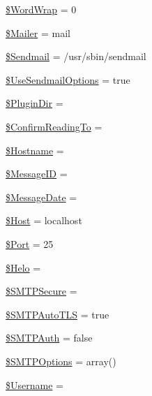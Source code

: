 \begin{DoxyCompactItemize}
\item 
\hyperlink{class_p_h_p_mailer_a8e8553ff133401f5324229a988995a34}{\$\+Word\+Wrap} = 0
\item 
\hyperlink{class_p_h_p_mailer_a7792543896c9a827d4bfd3e29d2e0b01}{\$\+Mailer} = \textquotesingle{}mail\textquotesingle{}
\item 
\hyperlink{class_p_h_p_mailer_aea0de75e10af3f581a0a412f41b9db66}{\$\+Sendmail} = \textquotesingle{}/usr/sbin/sendmail\textquotesingle{}
\item 
\hyperlink{class_p_h_p_mailer_a49c6457299f19cc2cb83ba1e8f98f578}{\$\+Use\+Sendmail\+Options} = true
\item 
\hyperlink{class_p_h_p_mailer_a80c30e6b011ed425f82610685c961df7}{\$\+Plugin\+Dir} = \textquotesingle{}\textquotesingle{}
\item 
\hyperlink{class_p_h_p_mailer_a7bd5233c41d3f1cd2b653433fa88b8ed}{\$\+Confirm\+Reading\+To} = \textquotesingle{}\textquotesingle{}
\item 
\hyperlink{class_p_h_p_mailer_a48a6eac112dcc8617b4001d985b656c8}{\$\+Hostname} = \textquotesingle{}\textquotesingle{}
\item 
\hyperlink{class_p_h_p_mailer_adf09200a8d2c3460c6b16a7ae554a69e}{\$\+Message\+ID} = \textquotesingle{}\textquotesingle{}
\item 
\hyperlink{class_p_h_p_mailer_a4812372af8756f11c88ef5f7eac3b7ee}{\$\+Message\+Date} = \textquotesingle{}\textquotesingle{}
\item 
\hyperlink{class_p_h_p_mailer_ad019d6ecb4db4cd981fb7aeae7fbfc2c}{\$\+Host} = \textquotesingle{}localhost\textquotesingle{}
\item 
\hyperlink{class_p_h_p_mailer_a3e9844389378050f7a95b67b329edf90}{\$\+Port} = 25
\item 
\hyperlink{class_p_h_p_mailer_a361dc28dd21d5c555a1645bcdf8bab66}{\$\+Helo} = \textquotesingle{}\textquotesingle{}
\item 
\hyperlink{class_p_h_p_mailer_a70335250830975e0f1f77bb73b90ca54}{\$\+S\+M\+T\+P\+Secure} = \textquotesingle{}\textquotesingle{}
\item 
\hyperlink{class_p_h_p_mailer_a1765f2c1205d3c2c0b7000ec66e2805f}{\$\+S\+M\+T\+P\+Auto\+T\+LS} = true
\item 
\hyperlink{class_p_h_p_mailer_aba02a4c8ff018b73b192831a761fe9ca}{\$\+S\+M\+T\+P\+Auth} = false
\item 
\hyperlink{class_p_h_p_mailer_a5d73e4c2277f6435448b321e98794bf5}{\$\+S\+M\+T\+P\+Options} = array()
\item 
\hyperlink{class_p_h_p_mailer_a0e2ea0d42b9b800eb5bf8660587f5f7f}{\$\+Username} = \textquotesingle{}\textquotesingle{}

\end{DoxyCompactItemize}

